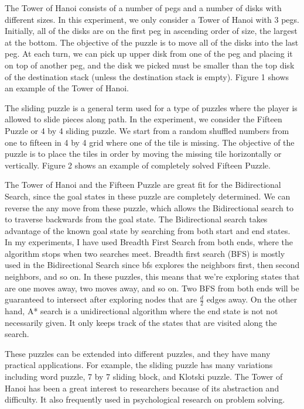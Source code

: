 \documentclass[conference]{IEEEtran}
\begin{document}
The Tower of Hanoi consists of a number of pegs and a number of disks with different sizes. In this experiment, we only consider a Tower of Hanoi with 3 pegs. Initially, all of the disks are on the first peg in ascending order of size, the largest at the bottom. The objective of the puzzle is to move all of the disks into the last peg. At each turn, we can pick up upper disk from one of the peg and placing it on top of another peg, and the disk we picked must be smaller than the top disk of the destination stack (unless the destination stack is empty). Figure 1 shows an example of the Tower of Hanoi.

The sliding puzzle is a general term used for a type of puzzles where the player is allowed to slide pieces along path. In the experiment, we consider the Fifteen Puzzle or 4 by 4 sliding puzzle. We start from a random shuffled numbers from one to fifteen in 4 by 4 grid where one of the tile is missing. The objective of the puzzle is to place the tiles in order by moving the missing tile horizontally or vertically. Figure 2 shows an example of completely solved Fifteen Puzzle.

The Tower of Hanoi and the Fifteen Puzzle are great fit for the Bidirectional Search, since the goal states in these puzzle are completely determined. We can reverse the any move from these puzzle, which allows the Bidirectional search to to traverse backwards from the goal state. The Bidirectional search takes advantage of the known goal state by searching from both start and end states. In my experiments, I have used Breadth First Search from both ends, where the algorithm stops when two searches meet. Breadth first search (BFS) is mostly used in the Bidirectional Search since bfs explores the neighbors first, then second neighbors, and so on. In these puzzles, this means that we're exploring states that are one moves away, two moves away, and so on. Two BFS from both ends will be guaranteed to intersect after exploring nodes that are $\frac{d}{2}$ edges away. On the other hand, A* search is a unidirectional algorithm where the end state is not not necessarily given. It only keeps track of the states that are visited along the search.

These puzzles can be extended into different puzzles, and they have many practical applications. For example, the sliding puzzle has many variations including word puzzle, 7 by 7 sliding block, and Klotski puzzle. The Tower of Hanoi has been a great interest to researchers because of its abstraction and difficulty. It also frequently used in psychological research on problem solving.
\end{document}
